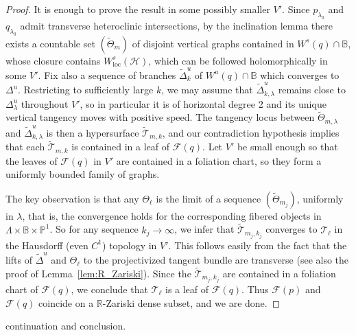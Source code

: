\documentclass[11pt, oneside]{amsart}
\newcommand{\B}{\mathbb{B}}
\newcommand{\R}{\mathbb{R}}
\renewcommand{\P}{\mathbb{P}}
\newcommand{\la}{\lambda}
\newcommand{\lo}{{\lambda_0}}
\newcommand{\loc}{{\mathrm{loc}}}
\theoremstyle{remark}
\theoremstyle{definition}
\theoremstyle{theorem}
\begin{document}
\begin{proof}  
It is enough to prove the result in some possibly smaller $V'$. 
Since $p_\lo$ and $q_\lo$ admit 
transverse heteroclinic intersections, by the inclination lemma there exists a 
countable set $(\widetilde \Theta_m)$ of disjoint vertical graphs contained in 
$W^s(q)\cap \B$, whose closure contains $W^s_\loc(\mathcal H)$, which can be followed holomorphically in some $V'$. 
Fix also a sequence of    branches $\widetilde \Delta^u_k$ of $W^u(q)\cap \B$ which converges to 
 $\Delta^u$. Restricting to sufficiently large $k$, we may assume that 
 $\widetilde \Delta^u_{k, \lambda}$ remains close to  $\Delta^u_\lambda$
  throughout $V'$, so in particular it is of horizontal degree 2 and its unique vertical tangency moves with positive speed. 
  The tangency locus 
between $\widetilde \Theta_{m,  \la}$ and $\widetilde \Delta^u_{k, \lambda}$  is then 
 a hypersurface $\widetilde {\mathcal T}_{m, k}$, 
and our contradiction hypothesis implies that each $\widetilde {\mathcal T}_{m, k}$ 
is contained in a leaf of $\mathcal F(q)$.
Let $V'$ be small enough so that the leaves of $\mathcal F(q)$ in $V'$ are contained in a foliation chart, 
so they form a  uniformly bounded family of  graphs.
 
 The key observation is that any $\Theta_{\ell}$ is the  limit of a sequence $(\widetilde \Theta_{m_j})$, uniformly in $\lambda$, that 
 is, the convergence holds for the corresponding fibered objects in $\Lambda\times \B\times \P^1$. 
 So for any sequence $k_j\to \infty$, we infer that $\widetilde {\mathcal T}_{m_j, k_j}$ converges to $\mathcal T_\ell$ in the Hausdorff (even $C^1$) topology in $V'$. 
This follows easily from  the fact that the lifts of  $\widetilde \Delta^u$ 
and $\Theta_{\ell}$ to the projectivized tangent bundle are transverse (see also the proof of Lemma~\ref{lem:R_Zariski}). 
Since the $\widetilde {\mathcal T}_{m_j, k_j}$ are contained in a foliation chart of $\mathcal F(q)$,
we conclude  that $\mathcal T_\ell$ is a leaf of $\mathcal F(q)$. Thus $\mathcal F(p)$ and $\mathcal F(q)$ coincide on a 
 $\R$-Zariski dense subset, and 
 we are done. 
\end{proof}

 continuation and conclusion. 
\end{document}
